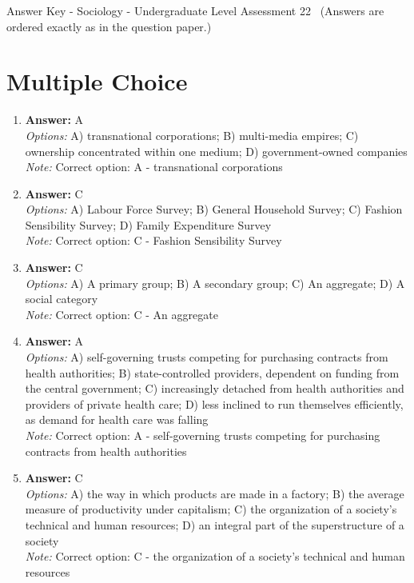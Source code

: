 \documentclass[12pt]{article}
\begin{document}
\begin{center}
Answer Key - Sociology - Undergraduate Level Assessment 22 \
\small (Answers are ordered exactly as in the question paper.)
\end{center}

\section*{Multiple Choice}
\begin{enumerate}[label=\arabic*.]
\item \textbf{Answer:} A
\\ \textit{Options:} A) transnational corporations; B) multi-media empires; C) ownership concentrated within one medium; D) government-owned companies
\\ \textit{Note:} Correct option: A - transnational corporations
\item \textbf{Answer:} C
\\ \textit{Options:} A) Labour Force Survey; B) General Household Survey; C) Fashion Sensibility Survey; D) Family Expenditure Survey
\\ \textit{Note:} Correct option: C - Fashion Sensibility Survey
\item \textbf{Answer:} C
\\ \textit{Options:} A) A primary group; B) A secondary group; C) An aggregate; D) A social category
\\ \textit{Note:} Correct option: C - An aggregate
\item \textbf{Answer:} A
\\ \textit{Options:} A) self-governing trusts competing for purchasing contracts from health authorities; B) state-controlled providers, dependent on funding from the central government; C) increasingly detached from health authorities and providers of private health care; D) less inclined to run themselves efficiently, as demand for health care was falling
\\ \textit{Note:} Correct option: A - self-governing trusts competing for purchasing contracts from health authorities
\item \textbf{Answer:} C
\\ \textit{Options:} A) the way in which products are made in a factory; B) the average measure of productivity under capitalism; C) the organization of a society's technical and human resources; D) an integral part of the superstructure of a society
\\ \textit{Note:} Correct option: C - the organization of a society's technical and human resources
\end{enumerate}
\end{document}
